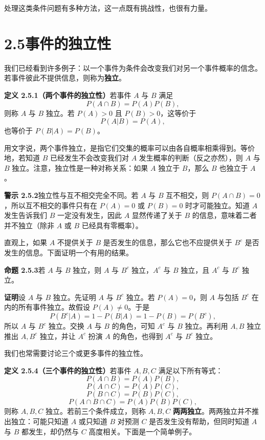 \documentclass[UTF8, 12pt, fontset=fandol, oneside]{ctexart}
\begin{document}
处理这类条件问题有多种方法，这一点既有挑战性，也很有力量。

\section*{2.5\quad 事件的独立性}

我们已经看到许多例子：以一个事件为条件会改变我们对另一个事件概率的信念。若事件彼此不提供信息，则称为\textbf{独立}。

\noindent\textbf{定义 2.5.1（两个事件的独立性）}\quad 若事件 $A$ 与 $B$ 满足
\[
  P(A\cap B)=P(A)P(B),
\]
则称 $A$ 与 $B$ 独立。若 $P(A)>0$ 且 $P(B)>0$，这等价于
\[
  P(A|B)=P(A),
\]
也等价于 $P(B|A)=P(B)$。

用文字说，两个事件独立，是指它们交集的概率可以由各自概率相乘得到。等价地，若知道 $B$ 已经发生不会改变我们对 $A$ 发生概率的判断（反之亦然），则 $A$ 与 $B$ 独立。注意，独立性是一种对称关系：如果 $A$ 独立于 $B$，那么 $B$ 也独立于 $A$。

\noindent\textbf{警示 2.5.2}\quad 独立性与互不相交完全不同。若 $A$ 与 $B$ 互不相交，则 $P(A\cap B)=0$，所以互不相交的事件只有在 $P(A)=0$ 或 $P(B)=0$ 时才可能独立。知道 $A$ 发生告诉我们 $B$ 一定没有发生，因此 $A$ 显然传递了关于 $B$ 的信息，意味着二者并不独立（除非 $A$ 或 $B$ 已经具有零概率）。

直观上，如果 $A$ 不提供关于 $B$ 是否发生的信息，那么它也不应提供关于 $B^c$ 是否发生的信息。下面证明一个有用的结果。

\noindent\textbf{命题 2.5.3}\quad 若 $A$ 与 $B$ 独立，则 $A$ 与 $B^c$ 独立，$A^c$ 与 $B$ 独立，且 $A^c$ 与 $B^c$ 独立。

\noindent\textbf{证明}\quad 设 $A$ 与 $B$ 独立。先证明 $A$ 与 $B^c$ 独立。若 $P(A)=0$，则 $A$ 与包括 $B^c$ 在内的所有事件独立。故假设 $P(A)\ne 0$。于是
\[
  P(B^c|A)=1-P(B|A)=1-P(B)=P(B^c),
\]
所以 $A$ 与 $B^c$ 独立。交换 $A$ 与 $B$ 的角色，可知 $A^c$ 与 $B$ 独立。再利用 $A,B$ 独立推出 $A,B^c$ 独立，并让 $A^c$ 扮演 $A$ 的角色，也得到 $A^c$ 与 $B^c$ 独立。

我们也常需要讨论三个或更多事件的独立性。

\noindent\textbf{定义 2.5.4（三个事件的独立性）}\quad 若事件 $A,B,C$ 满足以下所有等式：
\[
  P(A\cap B)=P(A)P(B),
\]
\[
  P(A\cap C)=P(A)P(C),
\]
\[
  P(B\cap C)=P(B)P(C),
\]
\[
  P(A\cap B\cap C)=P(A)P(B)P(C),
\]
则称 $A,B,C$ 独立。若前三个条件成立，则称 $A,B,C$ \textbf{两两独立}。两两独立并不推出独立：可能只知道 $A$ 或只知道 $B$ 对预测 $C$ 是否发生没有帮助，但同时知道 $A$ 与 $B$ 都发生，却仍然与 $C$ 高度相关。下面是一个简单例子。
\end{document}
